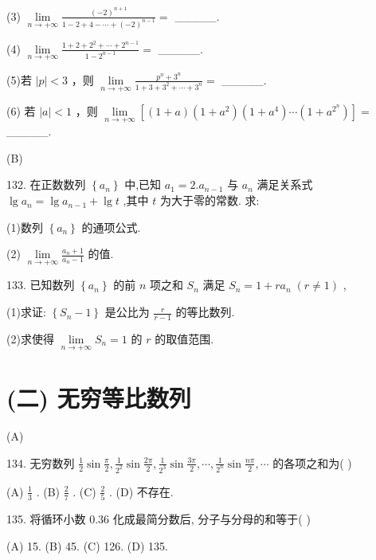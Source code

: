 \documentclass[10pt]{article}
\begin{document}
(3) \(\mathop{\lim }\limits_{{n \rightarrow   + \infty }}\frac{{\left( -2\right) }^{n + 1}}{1 - 2 + 4 - \cdots  + {\left( -2\right) }^{n - 1}} =\) \_\_\_\_\_.

(4) \(\mathop{\lim }\limits_{{n \rightarrow   + \infty }}\frac{1 + 2 + {2}^{2} + \cdots  + {2}^{n - 1}}{1 - {2}^{n - 1}} =\) \_\_\_\_\_.

(5)若 \(\left| p\right|  < 3\) ，则 \(\mathop{\lim }\limits_{{n \rightarrow   + \infty }}\frac{{p}^{n} + {3}^{n}}{1 + 3 + {3}^{2} + \cdots  + {3}^{n}} =\) \_\_\_\_\_.

(6) 若 \(\left| a\right|  < 1\) ，则 \(\mathop{\lim }\limits_{{n \rightarrow   + \infty }}\left\lbrack  {\left( {1 + a}\right) \left( {1 + {a}^{2}}\right) \left( {1 + {a}^{4}}\right) \cdots \left( {1 + {a}^{{2}^{n}}}\right) }\right\rbrack   =\) \_\_\_\_\_.

(B)

132. 在正数数列 \(\left\{  {a}_{n}\right\}\) 中,已知 \({a}_{1} = 2.{a}_{n - 1}\) 与 \({a}_{n}\) 满足关系式 \(\lg {a}_{n} = \lg {a}_{n - 1} + \lg t\) ,其中 \(t\) 为大于零的常数. 求:

(1)数列 \(\left\{  {a}_{n}\right\}\) 的通项公式.

(2) \(\mathop{\lim }\limits_{{n \rightarrow   + \infty }}\frac{{a}_{n} + 1}{{a}_{n} - 1}\) 的值.

133. 已知数列 \(\left\{  {a}_{n}\right\}\) 的前 \(n\) 项之和 \({S}_{n}\) 满足 \({S}_{n} = 1 + r{a}_{n}\;\left( {r \neq  1}\right)\) ,

(1)求证: \(\left\{  {{S}_{n} - 1}\right\}\) 是公比为 \(\frac{r}{r - 1}\) 的等比数列.

(2)求使得 \(\mathop{\lim }\limits_{{n \rightarrow   + \infty }}{S}_{n} = 1\) 的 \(r\) 的取值范围.

\section*{(二) 无穷等比数列}

(A)

134. 无穷数列 \(\frac{1}{2}\sin \frac{\pi }{2},\frac{1}{{2}^{2}}\sin \frac{2\pi }{2},\frac{1}{{2}^{3}}\sin \frac{3\pi }{2},\cdots ,\frac{1}{{2}^{n}}\sin \frac{n\pi }{2},\cdots\) 的各项之和为( )

(A) \(\frac{1}{3}\) . (B) \(\frac{2}{7}\) . (C) \(\frac{2}{5}\) . (D) 不存在.

135. 将循环小数 0.36 化成最简分数后, 分子与分母的和等于( )

(A) 15. (B) 45. (C) 126. (D) 135.
\end{document}
